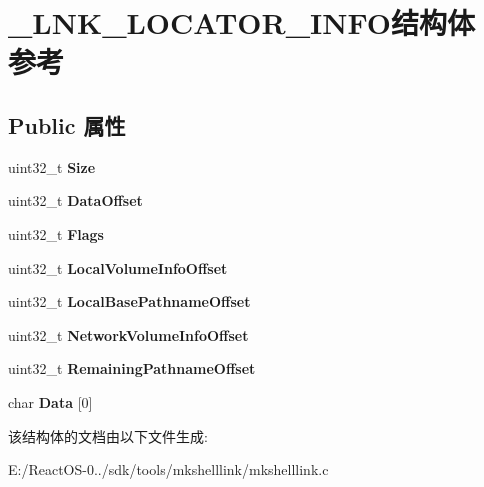 \hypertarget{struct___l_n_k___l_o_c_a_t_o_r___i_n_f_o}{}\section{\+\_\+\+L\+N\+K\+\_\+\+L\+O\+C\+A\+T\+O\+R\+\_\+\+I\+N\+F\+O结构体 参考}
\label{struct___l_n_k___l_o_c_a_t_o_r___i_n_f_o}
\subsection*{Public 属性}
\begin{DoxyCompactItemize}
\item 
\mbox{\label{struct___l_n_k___l_o_c_a_t_o_r___i_n_f_o_a5e07098c855c8f6fbdcb64e0b3ab085a}} 
uint32\+\_\+t {\bfseries Size}
\item 
\mbox{\label{struct___l_n_k___l_o_c_a_t_o_r___i_n_f_o_a23a13380efdfe78f4913201d268be566}} 
uint32\+\_\+t {\bfseries Data\+Offset}
\item 
\mbox{\label{struct___l_n_k___l_o_c_a_t_o_r___i_n_f_o_a252427ffef0c138c54a563729e963b2c}} 
uint32\+\_\+t {\bfseries Flags}
\item 
\mbox{\label{struct___l_n_k___l_o_c_a_t_o_r___i_n_f_o_ab3d5e362b2fd3c5acc3dbed8f06f56ee}} 
uint32\+\_\+t {\bfseries Local\+Volume\+Info\+Offset}
\item 
\mbox{\label{struct___l_n_k___l_o_c_a_t_o_r___i_n_f_o_a6263d3188ace7d879ccbefdb0735436e}} 
uint32\+\_\+t {\bfseries Local\+Base\+Pathname\+Offset}
\item 
\mbox{\label{struct___l_n_k___l_o_c_a_t_o_r___i_n_f_o_aeb0365b15026befdcd1dfbada2686afa}} 
uint32\+\_\+t {\bfseries Network\+Volume\+Info\+Offset}
\item 
\mbox{\label{struct___l_n_k___l_o_c_a_t_o_r___i_n_f_o_ae0349adbaecf4bc49d1f8b8922091637}} 
uint32\+\_\+t {\bfseries Remaining\+Pathname\+Offset}
\item 
\mbox{\label{struct___l_n_k___l_o_c_a_t_o_r___i_n_f_o_a832745bd3b15aa19bca6b078d07a074c}} 
char {\bfseries Data} \mbox{[}0\mbox{]}
\end{DoxyCompactItemize}


该结构体的文档由以下文件生成\+:\begin{DoxyCompactItemize}
\item 
E\+:/\+React\+O\+S-\/0../sdk/tools/mkshelllink/mkshelllink.\+c\end{DoxyCompactItemize}
